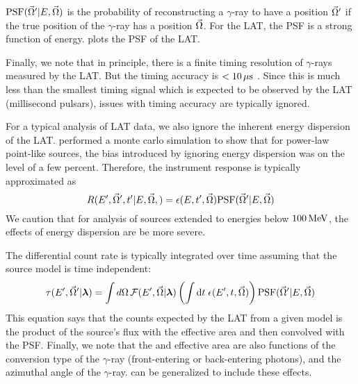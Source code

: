 $\text{PSF}(\vec\Omega'|E,\vec\Omega)$ is the probability of reconstructing
a $\gamma$-ray to have a position $\vec\Omega'$ if the true position of
the $\gamma$-ray has a position $\vec\Omega$.  For the \ac{LAT}, the
\ac{PSF} is a strong function of energy.  
plots the \ac{PSF} of the \ac{LAT}.

Finally, we note that in principle, there is a finite timing resolution
of $\gamma$-rays measured by the \ac{LAT}. But the timing accuracy is
$<10\,\mu\text{s}$ \citep{atwood_2009a_large-telescope}. Since
this is much less than the smallest timing signal which is expected to
be observed by the \ac{LAT} (millisecond pulsars), issues with timing
accuracy are typically ignored.

For a typical analysis of \ac{LAT} data, we also ignore the inherent
energy dispersion of the \ac{LAT}.  \cite{ackermann_2012a_fermi-large}
performed a monte carlo simulation to show that for power-law point-like
sources, the bias introduced by ignoring energy dispersion was on the
level of a few percent.  Therefore, the instrument response is typically
approximated as
\begin{equation}
  R(E',\vec\Omega',t'|E,\vec\Omega,) = 
  \epsilon(E,t',\vec\Omega) \text{PSF}(\vec\Omega'|E,\vec\Omega)
\end{equation}
We caution that for analysis of sources extended to energies below
$100\,\text{MeV}$, the effects of energy dispersion are be more
severe.

The differential count rate is typically integrated over time 
assuming that the source model is time independent:
\begin{equation}\eqnlabel{differential_model_counts}
  \eventrate(\energy',\solidangle'|\modelparams)
  = \int \dsolidangle \,
  \fluxdensity(\energy',\vec\Omega|\modelparams) 
\left(
\int \dtime \intspace \effectivearea(\energy',\time,\solidangle) 
\right)
\psf(\solidangle'|E,\solidangle)
\end{equation}
This equation says that the counts expected by the \ac{LAT} from a
given model is the product of the source's flux with the effective
area and then convolved with the \ac{PSF}.  Finally, we note that the
\psf and effective area are also functions of the conversion type of the
$\gamma$-ray (front-entering or back-entering photons), and the azimuthal
angle of the $\gamma$-ray.   can be
generalized to include these effects.

